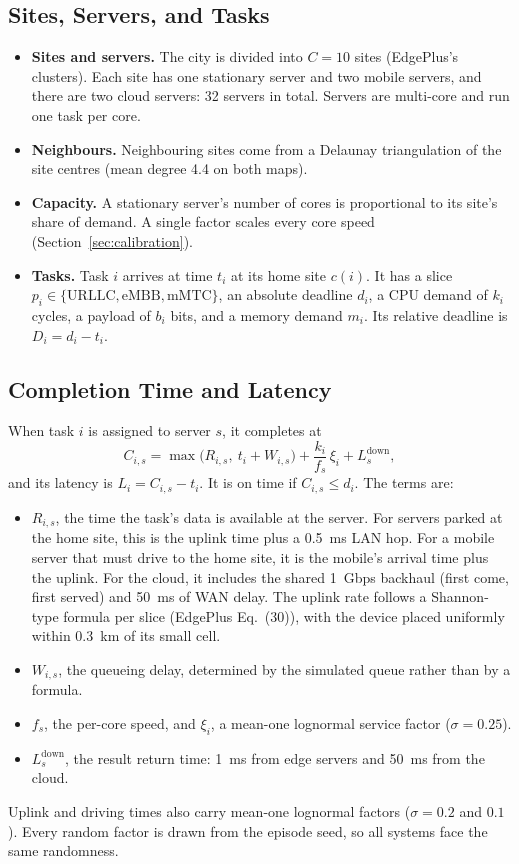 \documentclass[11pt,journal,onecolumn]{IEEEtran}
\begin{document}
\subsection{Sites, Servers, and Tasks}
\begin{itemize}
\item \textbf{Sites and servers.} The city is divided into $C=10$ sites (EdgePlus's clusters). Each site has one stationary server and two mobile servers, and there are two cloud servers: 32 servers in total. Servers are multi-core and run one task per core.
\item \textbf{Neighbours.} Neighbouring sites come from a Delaunay triangulation of the site centres (mean degree 4.4 on both maps).
\item \textbf{Capacity.} A stationary server's number of cores is proportional to its site's share of demand. A single factor scales every core speed (Section~\ref{sec:calibration}).
\item \textbf{Tasks.} Task $i$ arrives at time $t_i$ at its home site $c(i)$. It has a slice $p_i \in \{\text{URLLC}, \text{eMBB}, \text{mMTC}\}$, an absolute deadline $d_i$, a CPU demand of $k_i$ cycles, a payload of $b_i$ bits, and a memory demand $m_i$. Its relative deadline is $D_i = d_i - t_i$.
\end{itemize}

\subsection{Completion Time and Latency}
When task $i$ is assigned to server $s$, it completes at
\begin{equation}
C_{i,s} = \max\bigl(R_{i,s},\ t_i + W_{i,s}\bigr) + \frac{k_i}{f_s}\,\xi_i + L^{\mathrm{down}}_s ,
\label{eq:completion}
\end{equation}
and its latency is $L_i = C_{i,s} - t_i$. It is on time if $C_{i,s} \le d_i$. The terms are:
\begin{itemize}
\item $R_{i,s}$, the time the task's data is available at the server. For servers parked at the home site, this is the uplink time plus a 0.5~ms LAN hop. For a mobile server that must drive to the home site, it is the mobile's arrival time plus the uplink. For the cloud, it includes the shared 1~Gbps backhaul (first come, first served) and 50~ms of WAN delay. The uplink rate follows a Shannon-type formula per slice (EdgePlus Eq.~(30)), with the device placed uniformly within 0.3~km of its small cell.
\item $W_{i,s}$, the queueing delay, determined by the simulated queue rather than by a formula.
\item $f_s$, the per-core speed, and $\xi_i$, a mean-one lognormal service factor ($\sigma=0.25$).
\item $L^{\mathrm{down}}_s$, the result return time: 1~ms from edge servers and 50~ms from the cloud.
\end{itemize}
Uplink and driving times also carry mean-one lognormal factors ($\sigma=0.2$ and $0.1$). Every random factor is drawn from the episode seed, so all systems face the same randomness.
\end{document}
